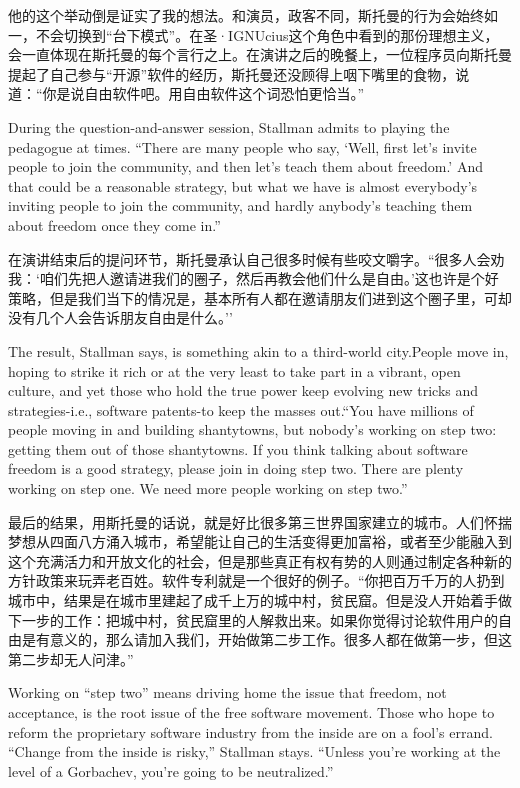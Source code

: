 \ifdefined\chs
他的这个举动倒是证实了我的想法。和演员，政客不同，斯托曼的行为会始终如一，不会切换到``台下模式''。在圣·IGNUcius这个角色中看到的那份理想主义，会一直体现在斯托曼的每个言行之上。在演讲之后的晚餐上，一位程序员向斯托曼提起了自己参与``开源''软件的经历，斯托曼还没顾得上咽下嘴里的食物，说道：``你是说自由软件吧。用自由软件这个词恐怕更恰当。''
\fi

\ifdefined\eng
During the question-and-answer session, Stallman admits to playing the pedagogue at times. ``There are many people who say, `Well, first let's invite people to join the community, and then let's teach them about freedom.' And that could be a reasonable strategy, but what we have is almost everybody's inviting people to join the community, and hardly anybody's teaching them about freedom once they come in.''
\fi

\ifdefined\chs
在演讲结束后的提问环节，斯托曼承认自己很多时候有些咬文嚼字。``很多人会劝我：`咱们先把人邀请进我们的圈子，然后再教会他们什么是自由。'这也许是个好策略，但是我们当下的情况是，基本所有人都在邀请朋友们进到这个圈子里，可却没有几个人会告诉朋友自由是什么。''
\fi

\ifdefined\eng
The result, Stallman says, is something akin to a third-world city.\ifdefined\vone People move in, hoping to strike it rich or at the very least to take part in a vibrant, open culture, and yet those who hold the true power keep evolving new tricks and strategies-i.e., software patents-to keep the masses out.\fi ``You have millions of people moving in and building shantytowns, but nobody's working on step two: getting them out of those shantytowns. If you think talking about software freedom is a good strategy, please join in doing step two. There are plenty working on step one. We need more people working on step two.''
\fi

\ifdefined\chs
最后的结果，用斯托曼的话说，就是好比很多第三世界国家建立的城市。\ifdefined\vone 人们怀揣梦想从四面八方涌入城市，希望能让自己的生活变得更加富裕，或者至少能融入到这个充满活力和开放文化的社会，但是那些真正有权有势的人则通过制定各种新的方针政策来玩弄老百姓。软件专利就是一个很好的例子。\fi ``你把百万千万的人扔到城市中，结果是在城市里建起了成千上万的城中村，贫民窟。但是没人开始着手做下一步的工作：把城中村，贫民窟里的人解救出来。如果你觉得讨论软件用户的自由是有意义的，那么请加入我们，开始做第二步工作。很多人都在做第一步，但这第二步却无人问津。''
\fi

\ifdefined\eng
Working on ``step two'' means driving home the issue that freedom, not acceptance, is the root issue of the free software movement. Those who hope to reform the proprietary software industry from the inside are on a fool's errand. ``Change from the inside is risky,'' Stallman stays. ``Unless you're working at the level of a Gorbachev, you're going to be neutralized.''
\fi

